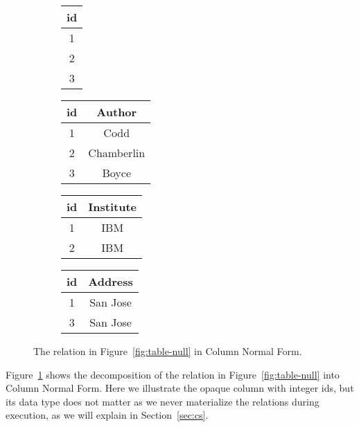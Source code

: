 \documentclass[sigconf]{acmart}
\begin{document}
\begin{figure}
\begin{subfigure}{0.09\linewidth}
\centering
\begin{tabular}{|c|}
\hline
\textsf{id} \\
\hline
1 \\
2 \\
3 \\
\hline
\end{tabular}
\end{subfigure}
\begin{subfigure}{0.31\linewidth}
\centering
\begin{tabular}{|c|c|}
\hline
\textsf{id} & \textsf{Author} \\
\hline
1 & Codd \\
2 & Chamberlin \\
3 & Boyce \\
\hline
\end{tabular}
\end{subfigure}
\centering
\begin{subfigure}{0.26\linewidth}
\centering
\begin{tabular}{|c|c|}
\hline
\textsf{id} & \textsf{Institute} \\
\hline
1 & IBM \\
2 & IBM \\
\hline
\end{tabular}
\end{subfigure}
\begin{subfigure}{0.26\linewidth}
\centering 
\begin{tabular}{|c|c|}
\hline
\textsf{id} & \textsf{Address} \\
\hline
1 & San Jose \\
3 & San Jose \\
\hline
\end{tabular}
\end{subfigure}
\caption{The relation in Figure~\ref{fig:table-null} in Column Normal Form.}
\label{fig:cnf}
\end{figure}

\begin{example}
\label{ex:cnf}
Figure~\ref{fig:cnf} shows the decomposition of the relation 
 in Figure~\ref{fig:table-null} into Column Normal Form.
Here we illustrate the opaque column with integer ids,
 but its data type does not matter as we never 
 materialize the relations during execution,
 as we will explain in Section~\ref{sec:cs}.
\end{example}
\end{document}
